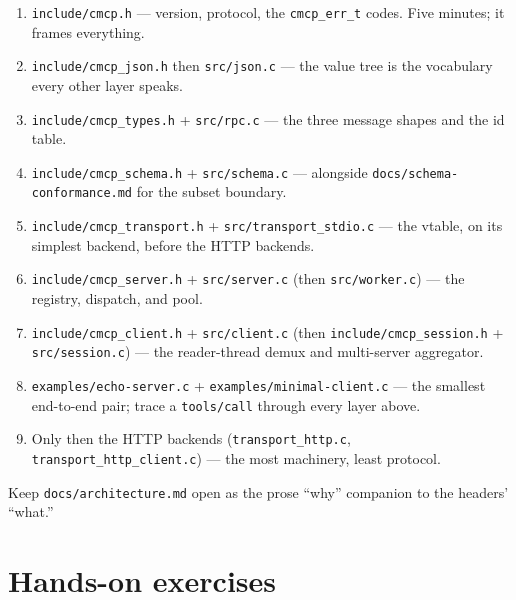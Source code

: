 \documentclass[10pt]{article}
\newcommand{\code}[1]{\texttt{\small #1}}
\begin{document}
\begin{enumerate}
  \item \code{include/cmcp.h} --- version, protocol, the \code{cmcp\_err\_t}
    codes. Five minutes; it frames everything.
  \item \code{include/cmcp\_json.h} then \code{src/json.c} --- the value tree is
    the vocabulary every other layer speaks.
  \item \code{include/cmcp\_types.h} + \code{src/rpc.c} --- the three message
    shapes and the id table.
  \item \code{include/cmcp\_schema.h} + \code{src/schema.c} --- alongside
    \code{docs/schema-conformance.md} for the subset boundary.
  \item \code{include/cmcp\_transport.h} + \code{src/transport\_stdio.c} --- the
    vtable, on its simplest backend, before the HTTP backends.
  \item \code{include/cmcp\_server.h} + \code{src/server.c} (then
    \code{src/worker.c}) --- the registry, dispatch, and pool.
  \item \code{include/cmcp\_client.h} + \code{src/client.c} (then
    \code{include/cmcp\_session.h} + \code{src/session.c}) --- the reader-thread
    demux and multi-server aggregator.
  \item \code{examples/echo-server.c} + \code{examples/minimal-client.c} --- the
    smallest end-to-end pair; trace a \code{tools/call} through every layer above.
  \item Only then the HTTP backends (\code{transport\_http.c},
    \code{transport\_http\_client.c}) --- the most machinery, least protocol.
\end{enumerate}

Keep \code{docs/architecture.md} open as the prose ``why'' companion to the
headers' ``what.''

\section{Hands-on exercises}
\end{document}
